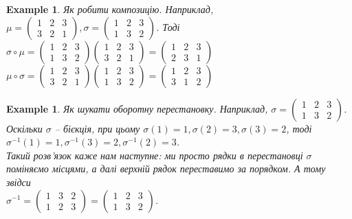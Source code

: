 \documentclass[a4paper, 10pt]{article}
\theoremstyle{theoremdd}
\theoremstyle{theoremdd}
\theoremstyle{theoremdd}
\theoremstyle{theoremdd}
\theoremstyle{theoremdd}
\newtheorem{example}[theorem]{Example}
\theoremstyle{theoremdd}
\theoremstyle{theoremdd}
\theoremstyle{theoremdd}
\theoremstyle{theoremdd}
\theoremstyle{theoremdd}
\theoremstyle{theoremdd}
\theoremstyle{theoremdd}
\theoremstyle{theoremdd}
\theoremstyle{theoremdd}
\theoremstyle{theoremdd}
\begin{document}
\begin{example} Як робити композицію. Наприклад, $\mu = \begin{pmatrix}
1 & 2 & 3 \\
3 & 2 & 1
\end{pmatrix}, \sigma = \begin{pmatrix}
1 & 2 & 3 \\
1 & 3 & 2
\end{pmatrix}$. Тоді\\
$\sigma \circ \mu = \begin{pmatrix}
1 & 2 & 3 \\
1 & 3 & 2
\end{pmatrix} \begin{pmatrix}
1 & 2 & 3 \\
3 & 2 & 1
\end{pmatrix} = \begin{pmatrix}
1 & 2 & 3 \\
2 & 3 & 1
\end{pmatrix}$\\
$\mu \circ \sigma = \begin{pmatrix}
1 & 2 & 3 \\
3 & 2 & 1
\end{pmatrix} \begin{pmatrix}
1 & 2 & 3 \\
1 & 3 & 2
\end{pmatrix} = \begin{pmatrix}
1 & 2 & 3 \\
3 & 1 & 2
\end{pmatrix}$
\end{example}

\begin{example}
Як шукати оборотну перестановку. Наприклад, $\sigma = \begin{pmatrix}
1 & 2 & 3 \\
1 & 3 & 2
\end{pmatrix}$.\\
Оскільки $\sigma$ -- бієкція, при цьому $\sigma(1) = 1, \sigma(2) = 3, \sigma(3) = 2$, тоді $\sigma^{-1}(1) = 1, \sigma^{-1}(3) = 2, \sigma^{-1}(2) = 3$. \\
Такий розв'язок каже нам наступне: ми просто рядки в перестановці $\sigma$ поміняємо місцями, а далі верхній рядок переставимо за порядком. А тому звідси\\
$\sigma^{-1} = \begin{pmatrix}
1 & 3 & 2 \\
1 & 2 & 3
\end{pmatrix} = \begin{pmatrix}
1 & 2 & 3 \\
1 & 3 & 2
\end{pmatrix}$.
\end{example}
\end{document}
